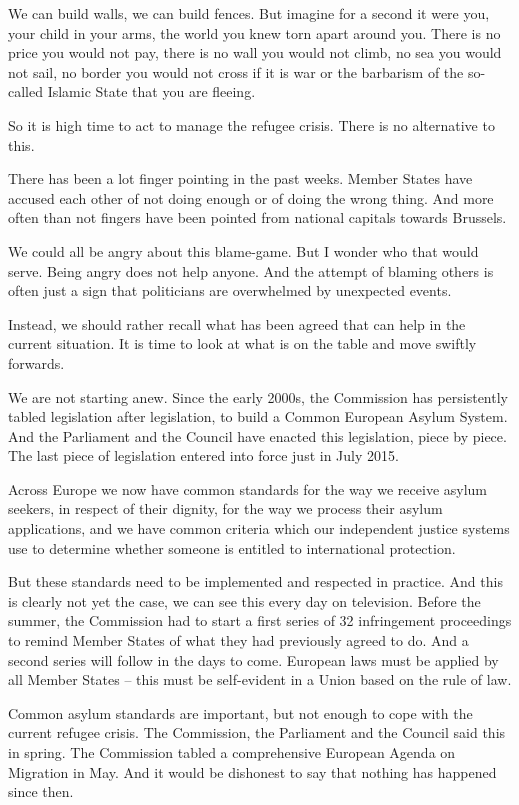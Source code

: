 \documentclass[a4paper,11pt]{article}
\begin{document}
We can build walls, we can build fences. But imagine for a second it were you, your child in your arms, the world you knew torn apart around you. There is no price you would not pay, there is no wall you would not climb, no sea you would not sail, no border you would not cross if it is war or the barbarism of the so-called Islamic State that you are fleeing.

So it is high time to act to manage the refugee crisis. There is no alternative to this.

There has been a lot finger pointing in the past weeks. Member States have accused each other of not doing enough or of doing the wrong thing. And more often than not fingers have been pointed from national capitals towards Brussels.

We could all be angry about this blame-game. But I wonder who that would serve. Being angry does not help anyone. And the attempt of blaming others is often just a sign that politicians are overwhelmed by unexpected events.

Instead, we should rather recall what has been agreed that can help in the current situation. It is time to look at what is on the table and move swiftly forwards.

We are not starting anew. Since the early 2000s, the Commission has persistently tabled legislation after legislation, to build a Common European Asylum System. And the Parliament and the Council have enacted this legislation, piece by piece. The last piece of legislation entered into force just in July 2015.

Across Europe we now have common standards for the way we receive asylum seekers, in respect of their dignity, for the way we process their asylum applications, and we have common criteria which our independent justice systems use to determine whether someone is entitled to international protection.

But these standards need to be implemented and respected in practice. And this is clearly not yet the case, we can see this every day on television. Before the summer, the Commission had to start a first series of 32 infringement proceedings to remind Member States of what they had previously agreed to do. And a second series will follow in the days to come. European laws must be applied by all Member States – this must be self-evident in a Union based on the rule of law.

Common asylum standards are important, but not enough to cope with the current refugee crisis. The Commission, the Parliament and the Council said this in spring. The Commission tabled a comprehensive European Agenda on Migration in May. And it would be dishonest to say that nothing has happened since then.
\end{document}
